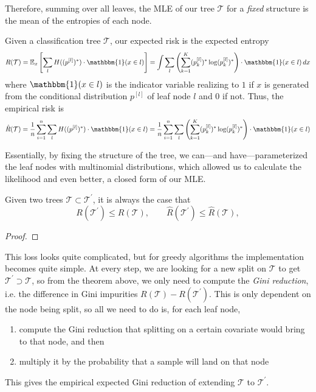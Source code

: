   Therefore, summing over all leaves, the MLE of our tree $\mathcal{T}$ for a \textit{fixed} structure is the mean of the entropies of each node. 

  \begin{theorem}
    Given a classification tree $\mathcal{T}$, our expected risk is the expected entropy 
    \begin{equation}
      R(\mathcal{T}) = \mathbb{E}_x \left[ \sum_l H((p^{[l]})^\ast) \cdot \mathbbm{1}(x \in l) \right] = \int \sum_l \left( \sum_{k=1}^K (p_k^{[l]})^\ast \log (p_k^{[l]})^\ast \right) \cdot \mathbbm{1}(x \in l) \,dx 
    \end{equation}
    where $\mathbbm{1}(x \in l)$ is the indicator variable realizing to $1$ if $x$ is generated from the conditional distribution $p^{[l]}$ of leaf node $l$ and $0$ if not. Thus, the empirical risk is 
    \begin{equation}
      \hat{R}(\mathcal{T}) = \frac{1}{n} \sum_{i=1}^n \sum_{l} H( (p^{[l]})^\ast) \cdot \mathbbm{1}(x \in l) = \frac{1}{n} \sum_{i=1}^n \sum_{l} \left( \sum_{k=1}^K (p_k^{[l]})^\ast \log (p_k^{[l]})^\ast \right) \cdot \mathbbm{1}(x \in l)
    \end{equation}
  \end{theorem}

  Essentially, by fixing the structure of the tree, we can---and have---parameterized the leaf nodes with multinomial distributions, which allowed us to calculate the likelihood and even better, a closed form of our MLE. 

  \begin{theorem}
    Given two trees $\mathcal{T} \subset \mathcal{T}^\prime$, it is always the case that 
    \begin{equation}
      R(\mathcal{T}^\prime) \leq R(\mathcal{T}), \qquad \hat{R}(\mathcal{T}^\prime) \leq \hat{R}(\mathcal{T}), 
    \end{equation}
  \end{theorem}
  \begin{proof}
    
  \end{proof}

  This loss looks quite complicated, but for greedy algorithms the implementation becomes quite simple. At every step, we are looking for a new split on $\mathcal{T}$ to get $\mathcal{T}^\prime \supset \mathcal{T}$, so from the theorem above, we only need to compute the \textit{Gini reduction}, i.e. the difference in Gini impurities $R(\mathcal{T}) - R(\mathcal{T}^\prime)$. This is only dependent on the node being split, so all we need to do is, for each leaf node, 
  \begin{enumerate}
    \item compute the Gini reduction that splitting on a certain covariate would bring to that node, and then 
    \item multiply it by the probability that a sample will land on that node
  \end{enumerate} 
  This gives the empirical expected Gini reduction of extending $\mathcal{T}$ to $\mathcal{T}^\prime$. 

